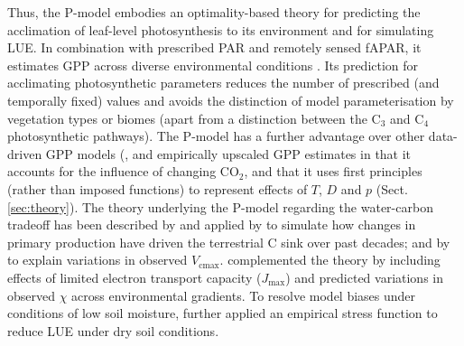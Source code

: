 \documentclass[gmd, manuscript]{copernicus}
\newcommand{\vcmax}{$V_{\text{cmax}}$}
\newcommand{\jmax}{$J_{\text{max}}$}
\begin{document}
Thus, the P-model embodies an optimality-based theory for predicting the acclimation of leaf-level photosynthesis to its environment and for simulating LUE. In combination with prescribed PAR and remotely sensed fAPAR, it estimates GPP across diverse environmental conditions \citep{wang17natpl}. Its prediction for acclimating photosynthetic parameters reduces the number of prescribed (and temporally fixed) values and avoids the distinction of model parameterisation by vegetation types or biomes (apart from a distinction between the C$_3$ and C$_4$ photosynthetic pathways). The P-model has a further advantage over other data-driven GPP models (\citep{running04, Zhang2017-yr}, and empirically upscaled GPP estimates \citep{jung11jgr} in that it accounts for the influence of changing CO$_2$, and that it uses first principles (rather than imposed functions) to represent effects of $T$, $D$ and $p$ (Sect. \ref{sec:theory}). The theory underlying the P-model regarding the water-carbon tradeoff has been described by \citet{prentice14ecollett} and applied by \citet{keenan17natcomm} to simulate how changes in primary production have driven the terrestrial C sink over past decades; and by \citet{smith19ecollett} to explain variations in observed \vcmax . \citet{wang17natpl} complemented the theory by including effects of limited electron transport capacity (\jmax ) and predicted variations in observed $\chi$ across environmental gradients. To resolve model biases under conditions of low soil moisture, \citep{stocker19natgeo} further applied an empirical stress function to reduce LUE under dry soil conditions.
\end{document}
